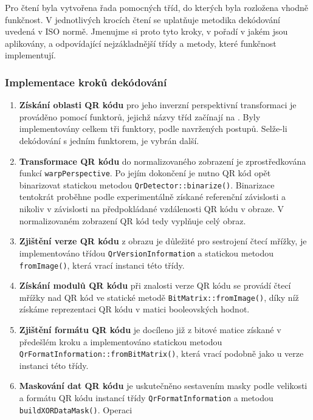 Pro čtení byla vytvořena řada pomocných tříd, do kterých byla rozložena vhodně
funkčnost. V jednotlivých krocích čtení se uplatňuje metodika dekódování uvedená
v ISO normě. Jmenujme si proto tyto kroky, v pořadí v jakém jsou aplikovány, a
odpovídající nejzákladnější třídy a metody, které funkčnost implementují.

\subsubsection{Implementace kroků dekódování}

\begin{enumerate}
  \item \textbf{Získání oblasti QR kódu} pro jeho inverzní perspektivní
  transformaci je prováděno pomocí funktorů, jejichž názvy tříd začínají na
  . Byly implementovány celkem tři funktory,
  podle navržených postupů. Selže-li dekódování s jedním funktorem, je vybrán další.
  \item \textbf{Transformace QR kódu} do normalizovaného zobrazení je
  zprostředkována funkcí \texttt{warpPerspective}. Po jejím dokončení je nutno
  QR kód opět binarizovat statickou metodou \texttt{QrDetector::binarize()}.
  Binarizace tentokrát proběhne podle experimentálně získané referenční závislosti a nikoliv v závislosti na předpokládané vzdálenosti QR kódu v obraze. V normalizovaném zobrazení QR kód tedy vyplňuje celý obraz.
  \item \textbf{Zjištění verze QR kódu} z obrazu je důležité pro sestrojení
  čtecí mřížky, je implementováno třídou \texttt{QrVersionInformation} a
  statickou metodou \texttt{fromImage()}, která vrací instanci této třídy.
  \item \textbf{Získání modulů QR kódu} při znalosti verze QR kódu se provádí
   čtecí mřížky nad QR kód ve statické metodě
  \texttt{BitMatrix::fromImage()}, díky níž získáme reprezentaci QR kódu v
  matici booleovských hodnot.
  \item \textbf{Zjištění formátu QR kódu} je docíleno již z bitové matice
  získané v předešlém kroku a implementováno statickou metodou
  \texttt{QrFormatInformation::fromBitMatrix()}, \linebreak[5]která vrací
  podobně jako u verze instanci této třídy.
  \item \textbf{Maskování dat QR kódu} je uskutečněno sestavením masky
  podle velikosti a formátu QR kódu instancí třídy
  \texttt{QrFormatInformation} a metodou \texttt{buildXORDataMask()}. Operaci

\end{enumerate}
